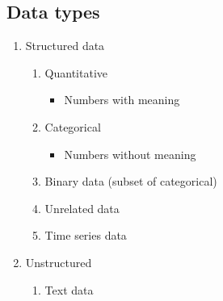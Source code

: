 \documentclass[11pt]{article}
\begin{document}
\subsection{Data types}
\label{sec:org2839e50}
\begin{enumerate}
\item Structured data
\begin{enumerate}
\item Quantitative
\begin{itemize}
\item Numbers with meaning
\end{itemize}
\item Categorical
\begin{itemize}
\item Numbers without meaning
\end{itemize}
\item Binary data (subset of categorical)
\item Unrelated data
\item Time series data
\end{enumerate}
\item Unstructured
\begin{enumerate}
\item Text data
\end{enumerate}
\end{enumerate}
\end{document}
